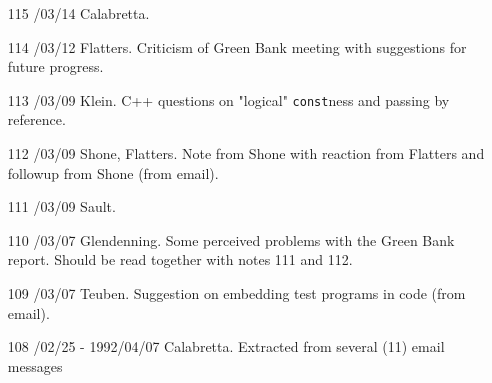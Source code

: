 \begin{enumerate}
\item[115]
/03/14 Calabretta.

\item[114]
/03/12 Flatters.
\linebreak  Criticism of Green Bank meeting with suggestions for future progress.

\item[113]
/03/09 Klein.
\linebreak  C++ questions on "logical" \texttt{const}ness and passing by reference.

\item[112]
/03/09 Shone, Flatters.
\linebreak  Note from Shone with reaction from Flatters and followup from Shone
   (from email).

\item[111]
/03/09 Sault.

\item[110]
/03/07 Glendenning.
\linebreak  Some perceived problems with the Green Bank report.  Should be read
   together with notes 111 and 112.

\item[109]
/03/07 Teuben.
\linebreak  Suggestion on embedding test programs in code (from email).

\item[108]
/02/25 - 1992/04/07 Calabretta.
\linebreak  Extracted from several (11) email messages


\end{enumerate}
